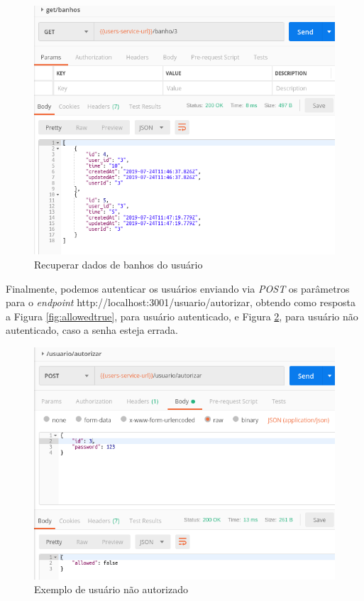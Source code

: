 \begin{figure}[htbp]
	\centering
	\includegraphics[width=0.7\linewidth]{figuras/postman/getbanhos.png}
	\caption{Recuperar dados de banhos do usuário}
	\label{fig:banhos}
\end{figure}

Finalmente, podemos autenticar os usuários enviando via \textit{POST} os parâmetros para o \textit{endpoint} http://localhost:3001/usuario/autorizar, obtendo como resposta a Figura \ref{fig:allowedtrue}, para usuário autenticado, e Figura \ref{fig:allowedfalse}, para usuário não autenticado, caso a senha esteja errada.

\begin{figure}[htbp]
	\centering
	\includegraphics[width=0.7\linewidth]{figuras/postman/allowedfalse.png}
	\caption{Exemplo de usuário não autorizado}
	\label{fig:allowedfalse}
\end{figure}

